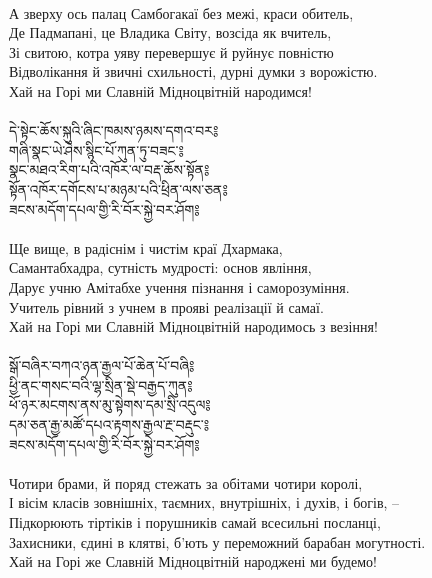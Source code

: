 \\
А зверху ось палац Самбогакаї без межі, краси обитель,\\
Де Падмапані, це Владика Світу, возсіда як вчитель,\\
Зі свитою, котра уяву перевершує й руйнує повністю\\
Відволікання й звичні схильності, дурні думки з ворожістю.\\
Хай на Горі ми Славній Мідноцвітній народимся!\\
\\
{\ti དེ་སྟེང་ཆོས་སྐུའི་ཞིང་ཁམས་ཉམས་དགའ་བར༔\\
གཞི་སྣང་ཡེ་ཤེས་སྙིང་པོ་ཀུན་ཏུ་བཟང་༔\\
སྣང་མཐའ་རིག་པའི་འཁོར་ལ་བརྡ་ཆོས་སྟོན༔\\
སྟོན་འཁོར་དགོངས་པ་མཉམ་པའི་ཕྲིན་ལས་ཅན༔\\
ཟངས་མདོག་དཔལ་གྱི་རི་བོར་སྐྱེ་བར་ཤོག༔}\\
\\
\ru
Ще вище, в радіснім і чистім краї Дхармака,\\
Самантабхадра, сутність мудрості: основ явління,\\
Дарує учню Амітабхе учення пізнання і саморозуміння.\\
Учитель рівний з учнем в прояві реалізації й самаї.\\
Хай на Горі ми Славній Мідноцвітній народимось з везіння!\\
\\
{\ti སྒོ་བཞིར་བཀའ་ཉན་རྒྱལ་པོ་ཆེན་པོ་བཞི༔\\
ཕྱི་ནང་གསང་བའི་ལྷ་སྲིན་སྡེ་བརྒྱད་ཀུན༔\\
ཕོ་ཉར་མངགས་ནས་མུ་སྟེགས་དམ་སྲི་འདུལ༔\\
དམ་ཅན་རྒྱ་མཚོ་དཔའ་རྟགས་རྒྱལ་རྔ་བརྡུང་༔\\
ཟངས་མདོག་དཔལ་གྱི་རི་བོར་སྐྱེ་བར་ཤོག༔}\\
\\
\ru
Чотири брами, й поряд стежать за обітами чотири королі,\\
І вісім класів зовнішніх, таємних, внутрішніх, і духів, і богів, --\\
Підкорюють тіртіків і порушників самай всесильні посланці,\\
Захисники, єдині в клятві, б'ють у переможний барабан могутності.\\
Хай на Горі же Славній Мідноцвітній народжені ми будемо!\\

